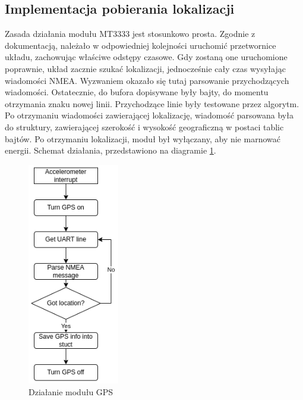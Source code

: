\subsection{Implementacja pobierania lokalizacji}
Zasada działania modułu MT3333 jest stosunkowo prosta. Zgodnie z dokumentacją\cite{MT3333}, należało w odpowiedniej kolejności uruchomić przetwornice układu, zachowując właściwe odstępy czasowe. Gdy zostaną one uruchomione poprawnie, układ zacznie szukać lokalizacji, jednocześnie cały czas wysyłając wiadomości NMEA. Wyzwaniem okazało się tutaj parsowanie przychodzących wiadomości. Ostatecznie, do bufora dopisywane były bajty, do momentu otrzymania znaku nowej linii. Przychodzące linie były testowane przez algorytm. Po otrzymaniu wiadomości zawierającej lokalizację, wiadomość parsowana była do struktury, zawierającej szerokość i wysokość geograficzną w postaci tablic bajtów. Po otrzymaniu lokalizacji, moduł był wyłączany, aby nie marnować energii. Schemat działania, przedstawiono na diagramie \ref{img:gps_diagram}.
\begin{figure}[h]
    \centering
    \includegraphics[width=4cm]{Graphics/GPS_NMEA.png}
    \caption{Działanie modułu GPS}
    \label{img:gps_diagram}
\end{figure}

